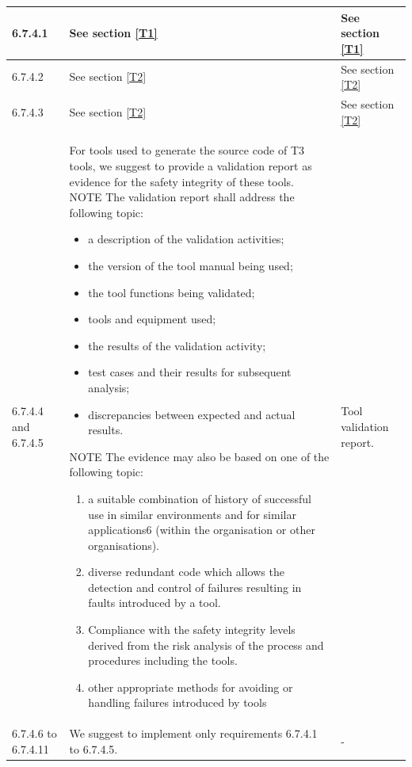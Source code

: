 \documentclass{template/openetcs_report}
\begin{document}
{\begin{longtable}{|p{2cm}|p{9cm}|p{3cm}|}
6.7.4.1 & See section \ref{T1} & See section \ref{T1}\\ 
\hline
6.7.4.2 & See section \ref{T2} & See section \ref{T2}\\ 
\hline
6.7.4.3 & See section \ref{T2} & See section \ref{T2}\\  
\hline
6.7.4.4 and 6.7.4.5 & For tools used to generate the source code of T3 tools, we suggest to provide a validation report as evidence for the safety integrity of these tools.
\linebreak
\linebreak
NOTE \linebreak
The validation report shall address the following topic:
\begin{itemize}\itemsep=0pt
  \item a description of the validation activities;
  \item the version of the tool manual being used;
  \item the tool functions being validated;
  \item tools and equipment used;
  \item the results of the validation activity;
  \item test cases and their results for subsequent analysis;
  \item discrepancies between expected and actual results.
\end{itemize}
NOTE \linebreak
The evidence may also be based on one of the following topic:
\begin{enumerate}\itemsep=0pt
  \item a suitable combination of history of successful use in similar environments and for similar applications6 (within the organisation or other organisations).
  \item diverse redundant code which allows the detection and control of failures resulting in faults introduced by a tool.
  \item Compliance with the safety integrity levels derived from the risk analysis of the process and procedures including the tools.
  \item other appropriate methods for avoiding or handling failures introduced by tools
\end{enumerate}
& Tool validation report.\\  
\hline
6.7.4.6 to 6.7.4.11 & We suggest to implement only requirements 6.7.4.1 to 6.7.4.5.
& - \\  
\hline
\end{longtable}}
\end{document}
